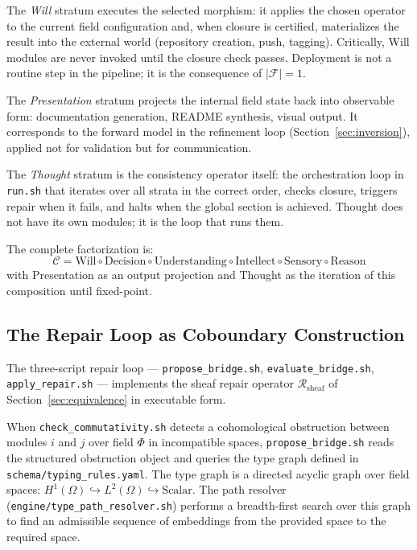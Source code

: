 \documentclass[11pt, oneside]{article}
\begin{document}
The \emph{Will} stratum executes the selected morphism: it applies the chosen operator
to the current field configuration and, when closure is certified, materializes the
result into the external world (repository creation, push, tagging). Critically, Will
modules are never invoked until the closure check passes. Deployment is not a routine
step in the pipeline; it is the consequence of $|\mathcal{F}| = 1$.

The \emph{Presentation} stratum projects the internal field state back into observable
form: documentation generation, README synthesis, visual output. It corresponds to the
forward model in the refinement loop (Section~\ref{sec:inversion}), applied not for
validation but for communication.

The \emph{Thought} stratum is the consistency operator itself: the orchestration loop
in \texttt{run.sh} that iterates over all strata in the correct order, checks closure,
triggers repair when it fails, and halts when the global section is achieved. Thought
does not have its own modules; it is the loop that runs them.

The complete factorization is:
\[
\mathcal{C} = \mathrm{Will} \circ \mathrm{Decision} \circ \mathrm{Understanding}
\circ \mathrm{Intellect} \circ \mathrm{Sensory} \circ \mathrm{Reason}
\]
with Presentation as an output projection and Thought as the iteration of this
composition until fixed-point.

\subsection{The Repair Loop as Coboundary Construction}

The three-script repair loop --- \texttt{propose\_bridge.sh},
\texttt{evaluate\_bridge.sh}, \texttt{apply\_repair.sh} --- implements the sheaf repair
operator $\mathcal{R}_{\mathrm{sheaf}}$ of Section~\ref{sec:equivalence} in executable
form.

When \texttt{check\_commutativity.sh} detects a cohomological obstruction between
modules $i$ and $j$ over field $\Phi$ in incompatible spaces, \texttt{propose\_bridge.sh}
reads the structured obstruction object and queries the type graph defined in
\texttt{schema/typing\_rules.yaml}. The type graph is a directed acyclic graph over
field spaces: $H^1(\Omega) \hookrightarrow L^2(\Omega) \hookrightarrow \mathrm{Scalar}$.
The path resolver (\texttt{engine/type\_path\_resolver.sh}) performs a breadth-first
search over this graph to find an admissible sequence of embeddings from the provided
space to the required space.
\end{document}
